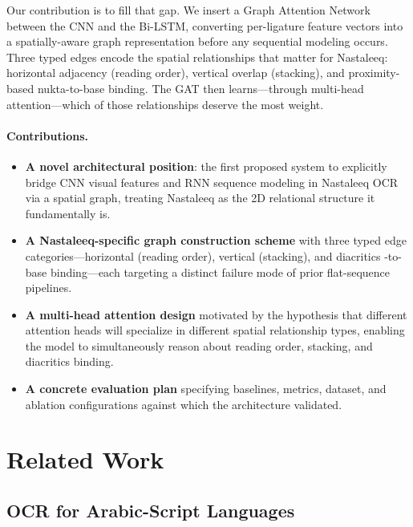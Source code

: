 \documentclass[11pt]{article}
\begin{document}
Our contribution is to fill that gap.
We insert a Graph Attention Network \citep{velickovic2018gat} between the CNN and the
Bi-LSTM, converting per-ligature feature vectors into a spatially-aware graph
representation before any sequential modeling occurs.
Three typed edges encode the spatial relationships that matter for Nastaleeq: horizontal
adjacency (reading order), vertical overlap (stacking), and proximity-based nukta-to-base
binding.
The GAT then learns---through multi-head attention---which of those relationships deserve
the most weight.

\paragraph{Contributions.}
\begin{itemize}[nosep]
  \item \textbf{A novel architectural position}: the first proposed system to explicitly
        bridge CNN visual features and RNN sequence modeling in Nastaleeq OCR via a
        spatial graph, treating Nastaleeq as the 2D relational structure it fundamentally
        is.
  \item \textbf{A Nastaleeq-specific graph construction scheme} with three typed edge
        categories---horizontal (reading order), vertical (stacking), and diacritics -to-base
        binding---each targeting a distinct failure mode of prior flat-sequence pipelines.
  \item \textbf{A multi-head attention design} motivated by the hypothesis that different
        attention heads will specialize in different spatial relationship types, enabling
        the model to simultaneously reason about reading order, stacking, and diacritics 
        binding.
  \item \textbf{A concrete evaluation plan} specifying baselines, metrics, dataset, and
        ablation configurations against which the architecture validated.
\end{itemize}

\section{Related Work}

\subsection{OCR for Arabic-Script Languages}
\end{document}
